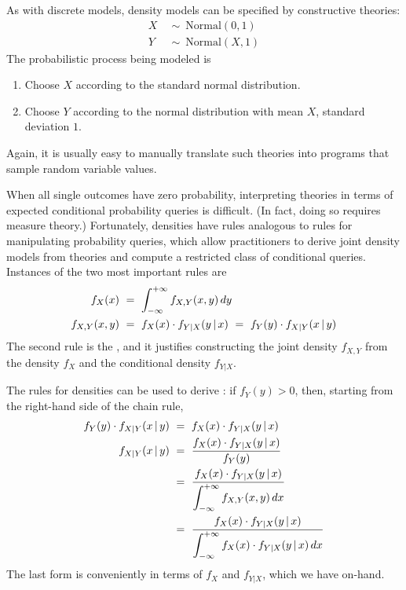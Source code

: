 As with discrete models, density models can be specified by constructive theories:
\begin{equation}
\begin{aligned}
	X&\ \sim\ \mathrm{Normal}(0,1) \\
	Y&\ \sim\ \mathrm{Normal}(X,1)
\end{aligned}
\end{equation}
The probabilistic process being modeled is
\begin{enumerate}
	\item Choose $X$ according to the standard normal distribution.
	\item Choose $Y$ according to the normal distribution with mean $X$, standard deviation $1$.
\end{enumerate}
Again, it is usually easy to manually translate such theories into programs that sample random variable values.

When all single outcomes have zero probability, interpreting theories in terms of expected conditional probability queries is difficult.
(In fact, doing so requires measure theory.)
Fortunately, densities have rules analogous to rules for manipulating probability queries, which allow practitioners to derive joint density models from theories and compute a restricted class of conditional queries.
Instances of the two most important rules are
\begin{equation}
\begin{aligned}
	f_{X}(x)&\ =\ \int_{-\infty}^{+\infty} f_{X,Y}(x,y)\,dy
\\
	f_{X,Y}(x,y)&\ =\ f_{X}(x) \cdot f_{Y|X}(y \given x)\ =\ f_{Y}(y) \cdot f_{X|Y}(x \given y)
\end{aligned}
\end{equation}
The second rule is the , and it justifies constructing the joint density $f_{X,Y}$ from the density $f_X$ and the conditional density $f_{Y|X}$.

The rules for densities can be used to derive : if $f_Y(y) > 0$, then, starting from the right-hand side of the chain rule,
\begin{equation}
\begin{aligned}
	f_{Y}(y) \cdot f_{X|Y}(x \,|\, y)&\ =\ f_{X}(x) \cdot f_{Y|X}(y \,|\, x)
\\
	f_{X|Y}(x \,|\, y)&\ =\ \frac{f_{X}(x) \cdot f_{Y|X}(y \,|\, x)}{f_{Y}(y)}
\\
	&\ =\ \frac{f_{X}(x) \cdot f_{Y|X}(y \,|\, x)}{\displaystyle\int_{-\infty}^{+\infty} f_{X,Y}(x,y)\,dx}
\\
	&\ =\ \frac{f_{X}(x) \cdot f_{Y|X}(y \,|\, x)}{\displaystyle\int_{-\infty}^{+\infty} f_{X}(x) \cdot f_{Y|X}(y \,|\, x)\,dx}
\end{aligned}
\end{equation}
The last form is conveniently in terms of $f_{X}$ and $f_{Y|X}$, which we have on-hand.

